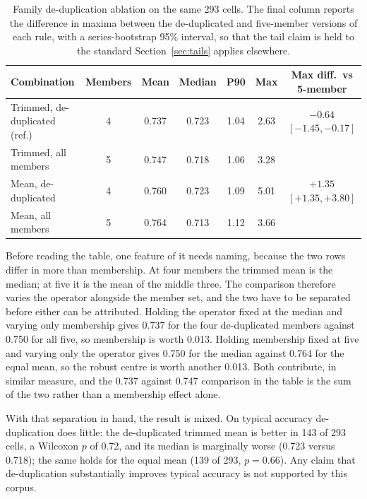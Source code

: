 \documentclass[11pt]{article}
\begin{document}
\begin{table}[htbp]\centering\small
\caption{Family de-duplication ablation on the same 293 cells. The final column reports the difference in maxima between the de-duplicated and five-member versions of each rule, with a series-bootstrap 95\% interval, so that the tail claim is held to the standard Section~\ref{sec:tails} applies elsewhere.}
\label{tab:dedup}
\begin{tabular}{lcccccc}
\toprule
Combination & Members & Mean & Median & P90 & Max & Max diff.\ vs 5-member \\
\midrule
Trimmed, de-duplicated (ref.) & 4 & 0.737 & 0.723 & 1.04 & 2.63 & $-0.64$ $[-1.45, -0.17]$ \\
Trimmed, all members & 5 & 0.747 & 0.718 & 1.06 & 3.28 & \\
Mean, de-duplicated & 4 & 0.760 & 0.723 & 1.09 & 5.01 & $+1.35$ $[+1.35, +3.80]$ \\
Mean, all members & 5 & 0.764 & 0.713 & 1.12 & 3.66 & \\
\bottomrule
\end{tabular}
\end{table}

Before reading the table, one feature of it needs naming, because the two rows differ in more than membership. At four members the trimmed mean is the median; at five it is the mean of the middle three. The comparison therefore varies the operator alongside the member set, and the two have to be separated before either can be attributed. Holding the operator fixed at the median and varying only membership gives 0.737 for the four de-duplicated members against 0.750 for all five, so membership is worth 0.013. Holding membership fixed at five and varying only the operator gives 0.750 for the median against 0.764 for the equal mean, so the robust centre is worth another 0.013. Both contribute, in similar measure, and the 0.737 against 0.747 comparison in the table is the sum of the two rather than a membership effect alone.

With that separation in hand, the result is mixed. On typical accuracy de-duplication does little: the de-duplicated trimmed mean is better in 143 of 293 cells, a Wilcoxon $p$ of 0.72, and its median is marginally worse (0.723 versus 0.718); the same holds for the equal mean (139 of 293, $p = 0.66$). Any claim that de-duplication substantially improves typical accuracy is not supported by this corpus.
\end{document}
